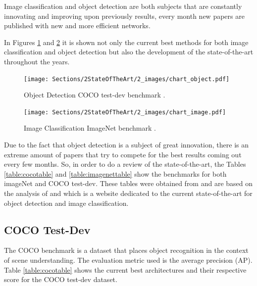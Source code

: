 \par Image classification and object detection are both subjects that are constantly innovating and improving upon previously results, every month new papers are published with new and more efficient networks. 
\par In Figures \ref{fig:leaderboard_object} and \ref{fig:leaderboard_image} it is shown  not only the current best methods for both image classification and object detection but also the development of the state-of-the-art throughout the years.





\begin{figure}[H]
    \centering
    \captionsetup{justification=centering}
    \texttt{[image: Sections/2StateOfTheArt/2\_images/chart\_object.pdf]}
    \caption[Object Detection COCO test-dev benchmark.]{Object Detection COCO test-dev benchmark \cite{papers_object}.}
    \label{fig:leaderboard_object}
\end{figure}

\begin{figure}[H]
    \centering
    \captionsetup{justification=centering}
    \texttt{[image: Sections/2StateOfTheArt/2\_images/chart\_image.pdf]}
    \caption[Image Classification ImageNet benchmark.]{Image Classification ImageNet benchmark \cite{papers_image}.}
    \label{fig:leaderboard_image}
\end{figure}



\par Due to the fact that object detection is a subject of great innovation, there is an extreme amount of papers that try to compete for the best results coming out every few months. So, in order to do a review of the state-of-the-art, the Tables \ref{table:cocotable} and \ref{table:imagenettable} show the benchmarks for both imageNet and COCO test-dev. These tables were obtained from \cite{Ribeiro} and are based on the analysis of \cite{papers_image} and \cite{papers_object} which is a website dedicated to  the current state-of-the-art for object detection and image classification.





\newpage
\subsection{COCO Test-Dev}

\par The COCO benchmark \cite{Lin2014} is a dataset that places object recognition in the context of scene understanding. The evaluation metric used is the average precision (AP). Table \ref{table:cocotable} shows the current best architectures and their respective score for the COCO test-dev dataset.

